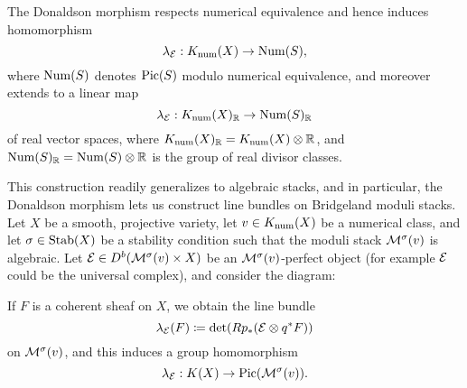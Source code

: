 \documentclass[letterpaper,11pt]{amsart}%
\theoremstyle{remark}
\begin{document}
The Donaldson morphism respects numerical equivalence and hence induces homomorphism
\[ \lambda_{\mathcal{E}}: K_{\mathrm{num}}(X) \to \mathrm{Num}(S), \]
where $\mathrm{Num}(S)$ denotes $\mathrm{Pic}(S)$ modulo numerical equivalence, and moreover extends to a linear map
\[ \lambda_{\mathcal{E}}: K_{\mathrm{num}}(X)_{\mathbb{R}} \to \mathrm{Num}(S)_{\mathbb{R}} \]
of real vector spaces, where $K_{\mathrm{num}}(X)_{\mathbb{R}} = K_{\mathrm{num}}(X) \otimes \mathbb{R}$, and $\mathrm{Num}(S)_{\mathbb{R}} = \mathrm{Num}(S) \otimes \mathbb{R}$ is the group of real divisor classes.


This construction readily generalizes to algebraic stacks, and in particular, the Donaldson morphism lets us construct line bundles on Bridgeland moduli stacks. Let $X$ be a smooth, projective variety, let $v \in K_{\mathrm{num}}(X)$ be a numerical class, and let $\sigma \in \operatorname{\mathrm{Stab}}(X)$ be a stability condition such that the moduli stack $\mathcal{M}^\sigma(v)$ is algebraic. Let $\mathcal{E} \in D^b(\mathcal{M}^\sigma(v) \times X)$ be an $\mathcal{M}^\sigma(v)$-perfect object (for example $\mathcal{E}$ could be the universal complex), and consider the diagram:
\begin{center}
\end{center}
If $F$ is a coherent sheaf on $X$, we obtain the line bundle
\[ \lambda_{\mathcal{E}}(F) \coloneqq \det(R p_*(\mathcal{E} \otimes q^*F)) \]
on $\mathcal{M}^\sigma(v)$, and this induces a group homomorphism
\[ \lambda_{\mathcal{E}}: K(X) \to \mathrm{Pic}(\mathcal{M}^\sigma(v)). \]
\end{document}

